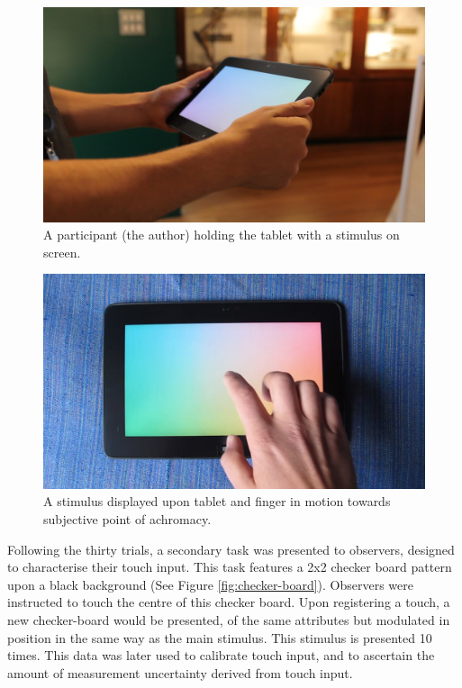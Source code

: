 \begin{figure}[hbp]
\includegraphics[max width=\textwidth]{figs/tablet/MVI_3213-1.jpg} %
\caption{A participant (the author) holding the tablet with a stimulus on screen.}
\label{fig:grant_demo}
\end{figure}

\begin{figure}[hbp]
\includegraphics[max width=\textwidth]{figs/tablet/MVI_3889-4.jpg} %
\caption{A stimulus displayed upon tablet and finger in motion towards subjective point of achromacy.}
\label{fig:finger}
\end{figure}

Following the thirty trials, a secondary task was presented to observers, designed to characterise their touch input. This task features a 2x2 checker board pattern upon a black background (See Figure \ref{fig:checker-board}). Observers were instructed to touch the centre of this checker board. Upon registering a touch, a new checker-board would be presented, of the same attributes but modulated in position in the same way as the main stimulus. This stimulus is presented 10 times. This data was later used to calibrate touch input, and to ascertain the amount of measurement uncertainty derived from touch input. 

